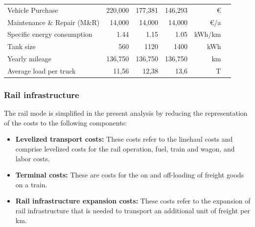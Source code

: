\documentclass[preprint,10pt,review, authoryear]{elsarticle}
\begin{document}
\begin{table}[H]
{\begin{tabular}{llllrl}
            Vehicle Purchase                   & \multicolumn{1}{r}{220,000}                     &\multicolumn{1}{r}{177,381}                     & \multicolumn{1}{r}{146,293}                    & \euro                    &   \citep{basma2023tco}        \\
            Maintenance \& Repair (M\&R)       & \multicolumn{1}{r}{14,000}                      & \multicolumn{1}{r}{14,000}                      & \multicolumn{1}{r}{14,000}                      & \euro/a                  &       \citep{transportandedecarb2021}    \\
            Specific energy consumption        & \multicolumn{1}{r}{1.44}                        & \multicolumn{1}{r}{1.15}                        & \multicolumn{1}{r}{1.05}                        & kWh/km                   &   \citep{transportandedecarb2021}       \\
            Tank size                          & \multicolumn{1}{r}{560}                         & \multicolumn{1}{r}{1120}                        & \multicolumn{1}{r}{1400}                        & kWh                      &       \citep{transportandedecarb2021}    \\
            Yearly mileage                     & \multicolumn{1}{r}{136,750}                     & \multicolumn{1}{r}{136,750}                     & \multicolumn{1}{r}{136,750}                     & km                       &        \citep{transportandedecarb2021}   \\
            Average load per truck                    & \multicolumn{1}{r}{11,56}                     & \multicolumn{1}{r}{12,38}                     & \multicolumn{1}{r}{13,6}                     & T                       &        \citep{SHOMAN2023103825}   \\
            \hline
            \end{tabular}
            }
            \end{table}

            
           
    \subsubsection{Rail infrastructure}
    The rail mode is simplified in the present analysis by reducing the representation of the costs to the following components: 
        \begin{itemize}
            \item \textbf{Levelized transport costs:} These costs refer to the linehaul costs and comprise levelized costs for the rail operation, fuel, train and wagon, and labor costs. 
            \item \textbf{Terminal costs:} These are costs for the on and off-loading of freight goods on a train. 
            \item \textbf{Rail infrastructure expansion costs:} These costs refer to the expansion of rail infrastructure that is needed to transport an additional unit of freight per km. 
        \end{itemize}
\end{document}
